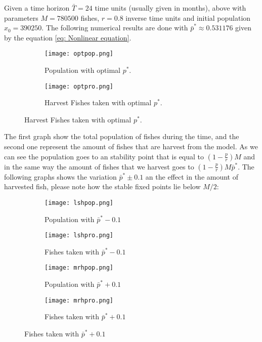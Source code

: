 Given a time horizon $\bar{T}=24$ time units (usually given in months), above with parameters $M=780500$ fishes, $r=0.8$ inverse time units and initial population $x_0=390250$. The following numerical results are done with $\bar{p}^*\approx 0.531176$ given by the equation \ref{eq: Nonlinear equation}. 

\begin{figure}[H]
	\centering
	\begin{subfigure}[b]{0.45\textwidth}
		\centering
		\texttt{[image: optpop.png]}
		\caption{Population with optimal $p^*$. }		
	\end{subfigure}
	\begin{subfigure}[b]{0.45\textwidth}
		\centering
		\texttt{[image: optpro.png]}
		\caption{Harvest Fishes taken with optimal $p^*$.}
	\end{subfigure}
\end{figure}

The first graph show the total population of fishes during the time, and the second one represent the amount of fishes that are harvest from the model. As we can see the population goes to an stability point that is equal to $\left(1-\frac{p}{r}\right)M$ and in the same way the amount of fishes that we harvest goes to $\left(1-\frac{p}{r}\right)M\bar{p}^*$. The following graphs shows the variation $\bar{p}^*\pm0.1$  an the effect in the amount of harvested fish, please note how the stable fixed points lie below $M/2$:
\begin{figure}[H]
	\centering 
	\begin{subfigure}[b]{0.45\textwidth}
		\texttt{[image: lshpop.png]}
		\caption{Population with $\bar{p}^*-0.1$}		
	\end{subfigure}
	\begin{subfigure}[b]{0.45\textwidth}
		\texttt{[image: lshpro.png]}
		\caption{Fishes taken with $\bar{p}^*-0.1$}			
	\end{subfigure}
	\begin{subfigure}[b]{0.45\textwidth}
		\texttt{[image: mrhpop.png]}
		\caption{Population with $\bar{p}^*+0.1$}			
	\end{subfigure}
	\begin{subfigure}[b]{0.45\textwidth}
		\texttt{[image: mrhpro.png]}
		\caption{Fishes taken with $\bar{p}^*+0.1$}			
	\end{subfigure}
\end{figure} 

